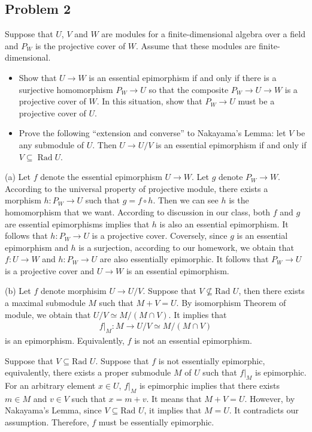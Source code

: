 \subsection*{Problem 2}
Suppose that $U$, $V$ and $W$ are modules for a finite-dimensional algebra over a field and $P_W$ is the projective cover of $W$. Assume that these modules are finite-dimensional.
\begin{itemize}
    \item[(a)] Show that $U \to W$ is an essential epimorphism if and only if there is a surjective homomorphism $P_W \to U$ so that the composite $P_W \to U \to W$ is a projective cover of $W$. In this situation, show that $P_W \to U$ must be a projective cover of $U$.
    \item[(b)] Prove the following ``extension and converse'' to Nakayama's Lemma: let $V$ be any submodule of $U$. Then $U \to U/V$ is an essential epimorphism if and only if $V \subseteq \operatorname{Rad} U$.
\end{itemize}
\begin{solution}
    (a) Let $f$ denote the essential epimorphism $U\to W$. Let $g$ denote $P_W\to W$. According to the universal property of projective module, there exists a morphism $h:P_W\to U$ such that $g=f\circ h$. Then we can see $h$ is the homomorphism that we want.  
    According to discussion in our class, both $f$ and $g$ are essential epimorphisms implies that $h$ is also an essential epimorphism. 
    It follows that $h:P_W\to U$ is a projective cover.
    Coversely, since $g$ is an essential epimorphism and $h$ is a surjection, according to our homework, we obtain that $f:U\to W$ and $h:P_W\to U$ are also essentially epimorphic.
    It follows that $P_W\to U$ is a projective cover and $U\to W$ is an essential epimorphism.

    (b) Let $f$ denote morphisim $U\to U/V$.
    Suppose that $V \not \subseteq \text{Rad }U$, then there exists a maximal submodule $M$ such that $M+V= U$. By isomorphism Theorem of module, we obtain that $U/V \simeq M/(M\cap V)$. It implies that 
    \begin{align*}
        f|_M:M \to U/V\simeq M/(M\cap V)
    \end{align*}
    is an epimorphism. Equivalently, $f$ is not an essential epimorphism.


    Suppose that $V\subseteq \text{Rad }U$. Suppose that $f$ is not essentially epimorphic, equivalently, there exists a proper submodule $M$ of $U$ such that $f|_{M}$ is epimorphic.
    For an arbitrary element $x\in U$, $f|_M$ is epimorphic implies that there exists $m\in M$ and $v\in V$ such that $x=m+v$.
    It means that $M+V=U$. However, by Nakayama's Lemma, since $V\subseteq \text{Rad }U$, it implies that $M=U$. It contradicts our assumption. Therefore, $f$ must be essentially epimorphic.

\end{solution}

